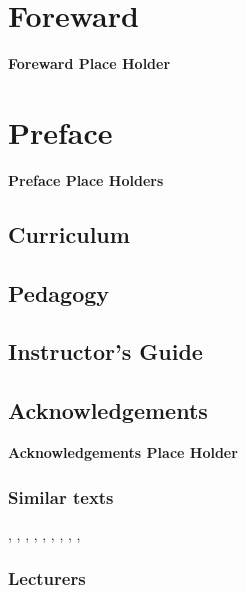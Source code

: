 \chapter*{Foreward}

\textbf{Foreward Place Holder}

\chapter*{Preface}

\textbf{Preface Place Holders}

\section*{Curriculum}

\section*{Pedagogy}

\section*{Instructor's Guide}

\section*{Acknowledgements}

\textbf{Acknowledgements Place Holder}

\subsection*{Similar texts}

\cite{Bender2005},
\cite{Biggs2002},
\cite{Gersting2003},
\cite{GoodaireP2001},
\cite{GrahamKP1994}, 
\cite{HaggardSW2005},
\cite{MR1952453},
\cite{MichaelsR1991},
\cite{Rosen2002},
\cite{Schneierman2012}


\subsection*{Lecturers}

